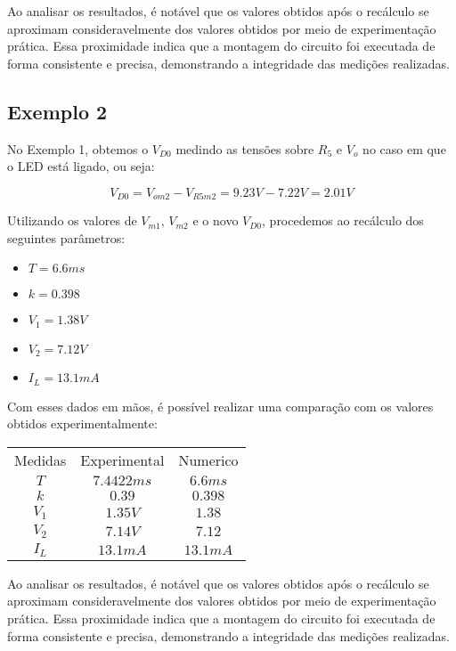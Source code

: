 Ao analisar os resultados, é notável que os valores obtidos após o recálculo se aproximam consideravelmente dos valores obtidos por meio de experimentação prática. Essa proximidade indica que a montagem do circuito foi executada de forma consistente e precisa, demonstrando a integridade das medições realizadas.

\subsection{Exemplo 2}

No Exemplo 1, obtemos o $V_{D0}$ medindo as tensões sobre $R_5$ e $V_o$ no caso em que o LED está ligado, ou seja:

\begin{equation}
    V_{D0} = V_{om2} - V_{R5m2} = 9.23V - 7.22V = 2.01V
\end{equation}

Utilizando os valores de $V_{m1}$, $V_{m2}$ e o novo $V_{D0}$, procedemos ao recálculo dos seguintes parâmetros:

\begin{itemize}
    \item $T = 6.6 ms$
    \item $k = 0.398$
    \item $V_1 = 1.38 V$
    \item $V_2 = 7.12 V$
    \item $I_L = 13.1mA$
\end{itemize}

Com esses dados em mãos, é possível realizar uma comparação com os valores obtidos experimentalmente:

\begin{center}
    \begin{tabular}{ |c|c|c| }
        \hline
        Medidas & Experimental & Numerico \\
        $T$     & $7.4422 ms$  & $6.6 ms$ \\
        $k$     & $0.39$       & $0.398$  \\
        $V_1$   & $1.35V$      & $1.38$   \\
        $V_2$   & $7.14V$      & $7.12$   \\
        $I_L$   & $13.1mA$     & $13.1mA$ \\
        \hline
    \end{tabular}
\end{center}

Ao analisar os resultados, é notável que os valores obtidos após o recálculo se aproximam consideravelmente dos valores obtidos por meio de experimentação prática. Essa proximidade indica que a montagem do circuito foi executada de forma consistente e precisa, demonstrando a integridade das medições realizadas.